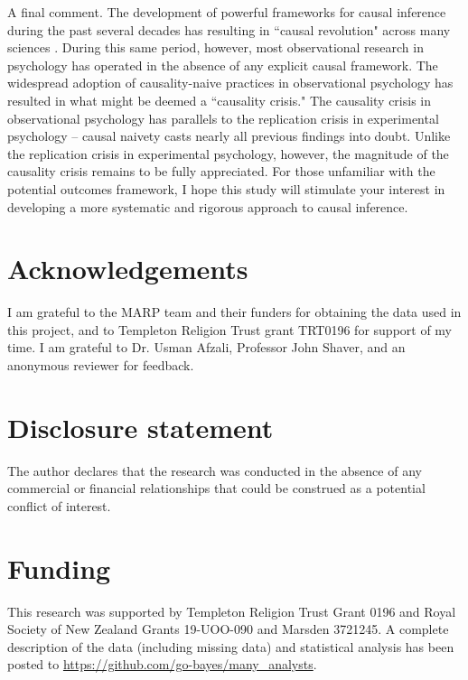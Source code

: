 \documentclass[]{interact}
\theoremstyle{plain}%
\theoremstyle{definition}
\theoremstyle{remark}
\begin{document}
A final comment. The development of powerful frameworks for causal inference during the past several decades has resulting in “causal revolution" across many sciences \citep{pearl_book_2018}. During this same period, however, most observational research in psychology has operated in the absence of any explicit causal framework. The widespread adoption of causality-naive practices in observational psychology has resulted in what might be deemed a ``causality crisis." The causality crisis in observational psychology has parallels to the replication crisis in experimental psychology -- causal naivety casts nearly all previous findings into doubt. Unlike the replication crisis in experimental psychology, however, the magnitude of the causality crisis remains to be fully appreciated. For those unfamiliar with the potential outcomes framework, I hope this study will stimulate your interest in developing a more systematic and rigorous approach to causal inference.



\section*{Acknowledgements}
I am grateful to the MARP team and their funders for obtaining the data used in this project, and to Templeton Religion Trust grant TRT0196 for support of my time. I am grateful to Dr. Usman Afzali, Professor John Shaver, and an anonymous reviewer for feedback. 


\section*{Disclosure statement}

The author declares that the research was conducted in the absence of any commercial or financial relationships that could be construed as a potential conflict of interest.


\section*{Funding}
This research was supported by Templeton Religion Trust Grant 0196 and Royal Society of New Zealand Grants 19-UOO-090 and Marsden 3721245. A complete description of the data (including missing data) and statistical analysis has been posted to \url{https://github.com/go-bayes/many_analysts}.
\end{document}
